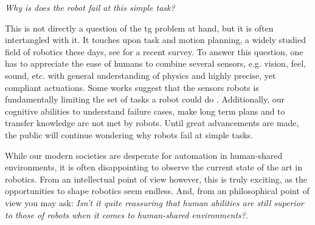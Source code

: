 \textit{Why is does the robot fail at this simple task?}

This is not directly a question of the \ac{tg} problem at
hand, but it is often intertangled with it. It touches upon
task and motion planning, a widely studied field of robotics
these days, see \cite{garrett2021integrated} for a recent
survey. To answer this question, one has to appreciate the
ease of humans to combine several sensors, e.g. vision,
feel, sound, etc. with general understanding of physics and
highly precise, yet compliant actuations. Some works suggest
that the sensors robots is fundamentally limiting the set of
tasks a robot could do \cite{majumdar2023fundamental}.
Additionally, our cognitive abilities to understand failure
cases, make long term plans and to transfer knowledge are
not met by robots. Until great advancements are made, the
public will continue wondering why robots fail at simple
tasks.

While our modern societies are desperate for automation in human-shared
environments, it is often disappointing to observe the current state of the art
in robotics. From an intellectual point of view however, this is truly exciting,
as the opportunities to shape robotics seem endless. And, from an philosophical
point of view you may ask: \textit{Isn't it quite reassuring that human
abilities are still superior to those of robots when it
comes to human-shared environments?}.
